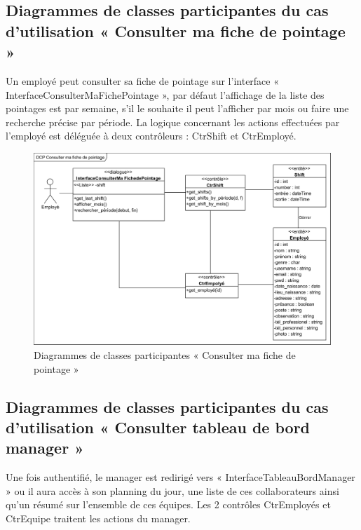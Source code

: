         \subsection*{Diagrammes de classes participantes du cas d'utilisation « Consulter ma fiche de pointage »}
            Un employé peut consulter sa fiche de pointage sur l’interface « InterfaceConsulterMaFichePointage », par défaut l’affichage de la liste des pointages est par semaine, s’il le souhaite il peut l’afficher par mois ou faire une recherche précise par période. La logique concernant les actions effectuées par l’employé est déléguée à deux contrôleurs : CtrShift et CtrEmployé.
            
            \begin{figure}[h!]
                 \centering
                \includegraphics[scale=0.72]{images/DCP/DCP Consulter ma fiche de pointage.png}
                 \caption{Diagrammes de classes participantes « Consulter ma fiche de pointage »}
                 \label{fig26}
            \end{figure}
            
        \subsection*{Diagrammes de classes participantes du cas d'utilisation « Consulter tableau de bord manager »}
        Une fois authentifié, le manager est redirigé vers « InterfaceTableauBordManager » ou il aura accès à son planning du jour, une liste de ces collaborateurs ainsi qu’un résumé sur l’ensemble de ces équipes. Les 2 contrôles CtrEmployés et CtrEquipe traitent les actions du manager. 

